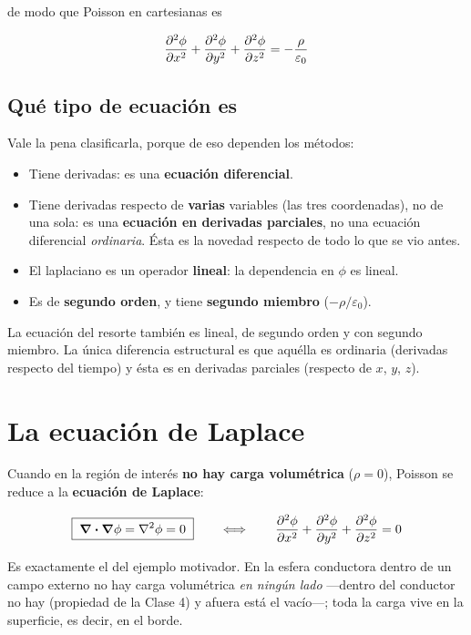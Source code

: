 \documentclass[12pt,a4paper]{article}
\begin{document}
de modo que Poisson en cartesianas es

\[
\pdv[2]{\phi}{x} + \pdv[2]{\phi}{y} + \pdv[2]{\phi}{z} = -\frac{\rho}{\varepsilon_0}
\]

\subsection{Qué tipo de ecuación es}

Vale la pena clasificarla, porque de eso dependen los métodos:

\begin{itemize}[leftmargin=*]
  \item Tiene derivadas: es una \textbf{ecuación diferencial}.
  \item Tiene derivadas respecto de \textbf{varias} variables (las tres
        coordenadas), no de una sola: es una \textbf{ecuación en derivadas
        parciales}, no una ecuación diferencial \emph{ordinaria}. Ésta es la
        novedad respecto de todo lo que se vio antes.
  \item El laplaciano es un operador \textbf{lineal}: la dependencia en $\phi$ es
        lineal.
  \item Es de \textbf{segundo orden}, y tiene \textbf{segundo miembro}
        ($-\rho/\varepsilon_0$).
\end{itemize}

\begin{notebox}
La ecuación del resorte también es lineal, de segundo orden y con segundo
miembro. La única diferencia estructural es que aquélla es ordinaria (derivadas
respecto del tiempo) y ésta es en derivadas parciales (respecto de $x$, $y$, $z$).
\end{notebox}

\section{La ecuación de Laplace}

Cuando en la región de interés \textbf{no hay carga volumétrica} ($\rho = 0$),
Poisson se reduce a la \textbf{ecuación de Laplace}:

\[
\boxed{\;\div\grad\phi = \laplacian\phi = 0\;}
\qquad\Longleftrightarrow\qquad
\pdv[2]{\phi}{x} + \pdv[2]{\phi}{y} + \pdv[2]{\phi}{z} = 0
\]

\begin{notebox}
Es exactamente el del ejemplo motivador. En la esfera conductora dentro de un
campo externo no hay carga volumétrica \emph{en ningún lado} ---dentro del
conductor no hay (propiedad de la Clase 4) y afuera está el vacío---; toda la
carga vive en la superficie, es decir, en el borde.
\end{notebox}
\end{document}
